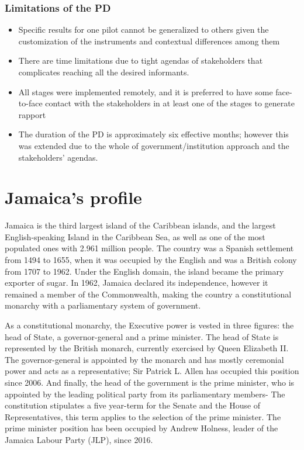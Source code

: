 \documentclass[
  10pt,
]{book}
\begin{document}
\hypertarget{limitations-of-the-pd}{%
\subsection*{Limitations of the PD}\label{limitations-of-the-pd}}

\begin{itemize}
\item
  Specific results for one pilot cannot be generalized to others given the customization of the instruments and contextual differences among them
\item
  There are time limitations due to tight agendas of stakeholders that complicates reaching all the desired informants.
\item
  All stages were implemented remotely, and it is preferred to have some face-to-face contact with the stakeholders in at least one of the stages to generate rapport
\item
  The duration of the PD is approximately six effective months; however this was extended due to the whole of government/institution approach and the stakeholders' agendas.
\end{itemize}

\hypertarget{section4}{%
\chapter{Jamaica's profile}\label{section4}}

Jamaica is the third largest island of the Caribbean islands, and the largest English-speaking Island in the Caribbean Sea, as well as one of the most populated ones with 2.961 million people. The country was a Spanish settlement from 1494 to 1655, when it was occupied by the English and was a British colony from 1707 to 1962. Under the English domain, the island became the primary exporter of sugar. In 1962, Jamaica declared its independence, however it remained a member of the Commonwealth, making the country a constitutional monarchy with a parliamentary system of government.

As a constitutional monarchy, the Executive power is vested in three figures: the head of State, a governor-general and a prime minister. The head of State is represented by the British monarch, currently exercised by Queen Elizabeth II. The governor-general is appointed by the monarch and has mostly ceremonial power and acts as a representative; Sir Patrick L. Allen has occupied this position since 2006. And finally, the head of the government is the prime minister, who is appointed by the leading political party from its parliamentary members- The constitution stipulates a five year-term for the Senate and the House of Representatives, this term applies to the selection of the prime minister. The prime minister position has been occupied by Andrew Holness, leader of the Jamaica Labour Party (JLP), since 2016.
\end{document}
